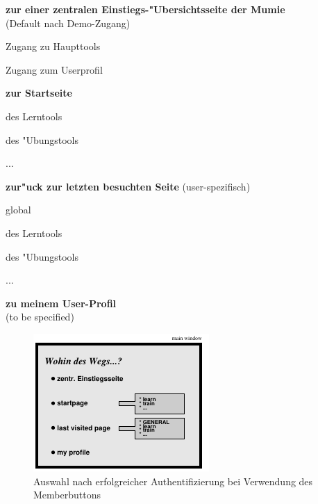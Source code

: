 \begin{list_sabina}
\item
\textbf{zur einer zentralen Einstiegs-"Ubersichtsseite der Mumie}\\
(Default nach Demo-Zugang)
        \begin{sub_list_sabina}
        \item
        Zugang zu Haupttools
        \item
        Zugang zum Userprofil
        \end{sub_list_sabina}
\item
\textbf{zur Startseite}
        \begin{sub_list_sabina}
        \item
        des Lerntools
        \item
        des "Ubungstools
        \item
        ...
        \end{sub_list_sabina}
\item
\textbf{zur"uck zur letzten besuchten Seite} (user-spezifisch)
        \begin{sub_list_sabina}
        \item  
        global
        \item
        des Lerntools
        \item
        des "Ubungstools
        \item
        ...
        \end{sub_list_sabina}
\item
\textbf{zu meinem User-Profil}\\
(to be specified)
\end{list_sabina}

\begin{figure}[h!]
\begin{center}
\ifx\pdfoutput\undefined
\else
  \includegraphics{Skizzen/weg_auswahl.pdf}
\fi
\caption{Auswahl nach erfolgreicher Authentifizierung bei Verwendung
des Memberbuttons}
\end{center}
\end{figure}


